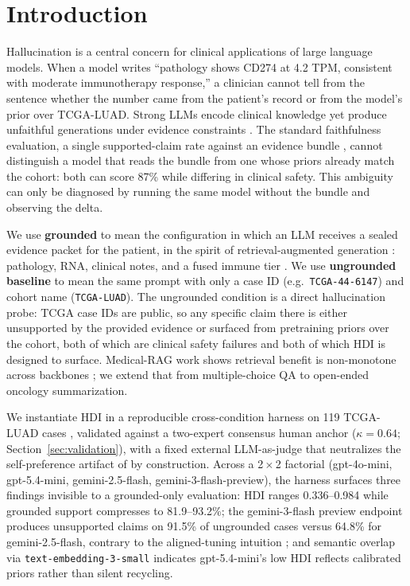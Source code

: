 \documentclass{article}
\theoremstyle{plain}
\begin{document}
\section{Introduction}
\label{sec:intro}

Hallucination is a central concern for clinical applications of large language models. When a model writes ``pathology shows CD274 at 4.2 TPM, consistent with moderate immunotherapy response,'' a clinician cannot tell from the sentence whether the number came from the patient's record or from the model's prior over TCGA-LUAD. Strong LLMs encode clinical knowledge \citep{singhal2023largelanguagemodelsencode} yet produce unfaithful generations under evidence constraints \citep{ji2023survey,maynez2020faithfulness,pal2023medhalt}. The standard faithfulness evaluation, a single supported-claim rate against an evidence bundle \citep{deyoung2021ms2,tsatsaronis2015bioasq}, cannot distinguish a model that reads the bundle from one whose priors already match the cohort: both can score 87\% while differing in clinical safety. This ambiguity can only be diagnosed by running the same model without the bundle and observing the delta.

We use \textbf{grounded} to mean the configuration in which an LLM receives a sealed evidence packet for the patient, in the spirit of retrieval-augmented generation \citep{lewis2020rag,shuster2021retrieval}: pathology, RNA, clinical notes, and a fused immune tier \citep{thorsson2018immune}. We use \textbf{ungrounded baseline} to mean the same prompt with only a case ID (e.g.\ \texttt{TCGA-44-6147}) and cohort name (\texttt{TCGA-LUAD}). The ungrounded condition is a direct hallucination probe: TCGA case IDs are public, so any specific claim there is either unsupported by the provided evidence or surfaced from pretraining priors over the cohort, both of which are clinical safety failures and both of which HDI is designed to surface. Medical-RAG work shows retrieval benefit is non-monotone across backbones \citep{xiong2024benchmarking}; we extend that from multiple-choice QA to open-ended oncology summarization.

We instantiate HDI in a reproducible cross-condition harness on 119 TCGA-LUAD cases \citep{collisson2014comprehensive}, validated against a two-expert consensus human anchor ($\kappa{=}0.64$; Section~\ref{sec:validation}), with a fixed external LLM-as-judge that neutralizes the self-preference artifact of \citet{panickssery2024llm} by construction. Across a 2\,$\times$\,2 factorial (gpt-4o-mini, gpt-5.4-mini, gemini-2.5-flash, gemini-3-flash-preview), the harness surfaces three findings invisible to a grounded-only evaluation: HDI ranges 0.336--0.984 while grounded support compresses to 81.9--93.2\%; the gemini-3-flash preview endpoint produces unsupported claims on 91.5\% of ungrounded cases versus 64.8\% for gemini-2.5-flash, contrary to the aligned-tuning intuition \citep{ouyang2022training}; and semantic overlap via \texttt{text-embedding-3-small} \citep{openai2024embeddings} indicates gpt-5.4-mini's low HDI reflects calibrated priors rather than silent recycling.
\end{document}
